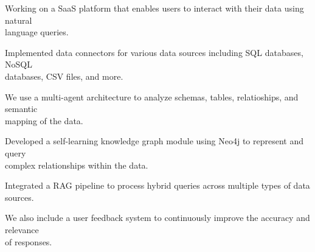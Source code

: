 \begin{resume_list}
  \item Working on a SaaS platform that enables users to interact with their data using natural \\ language queries.
  \item Implemented data connectors for various data sources including SQL databases, NoSQL \\ databases, CSV files, and more.
  \item We use a multi-agent architecture to analyze schemas, tables, relatioships, and semantic \\ mapping of the data.
  \item Developed a self-learning knowledge graph module using Neo4j to represent and query \\ complex relationships within the data.
  \item Integrated a RAG pipeline to process hybrid queries across multiple types of data sources.
  \item We also include a user feedback system to continuously improve the accuracy and relevance \\ of responses.
\end{resume_list}
